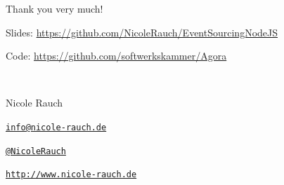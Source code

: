 \begin{frame}{Thank you very much!}

        Slides: \url{https://github.com/NicoleRauch/EventSourcingNodeJS} 
        \vspace{1em}

        Code: \url{https://github.com/softwerkskammer/Agora}
        
        ~\\[1em]
        \begin{block}{Nicole Rauch}
        \begin{description}[Twitterxx]
                \item[E-Mail]  \href{mailto:info@nicole-rauch.de}{\texttt{info@nicole-rauch.de}}
                \item[Twitter] \href{http://twitter.com/NicoleRauch}{\texttt{@NicoleRauch}}
                \item[Web] \href{http://www.nicole-rauch.de}{\texttt{http://www.nicole-rauch.de}}
        \end{description}
        \end{block}
\end{frame}

